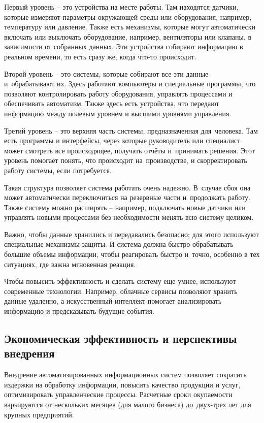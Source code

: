 \documentclass{ou}
\begin{document}
Первый уровень -- это устройства на месте работы. Там находятся датчики, которые измеряют параметры окружающей среды или оборудования, например, температуру или давление. Также есть механизмы, которые могут автоматически включать или выключать оборудование, например, вентиляторы или клапаны, в зависимости от собранных данных. Эти устройства собирают информацию в реальном времени, то есть сразу же, когда что-то происходит.

Второй уровень -- это системы, которые собирают все эти данные и~обрабатывают их. Здесь работают компьютеры и специальные программы, что позволяют контролировать работу оборудования, управлять процессами и обеспечивать автоматизм. Также здесь есть устройства, что передают информацию между полевым уровнем и высшими уровнями управления.

Третий уровень -- это верхняя часть системы, предназначенная для~человека. Там есть программы и интерфейсы, через которые руководитель или специалист может смотреть все происходящее, получать отчёты и~принимать решения. Этот уровень помогает понять, что происходит на~производстве, и скорректировать работу системы, если потребуется.

Такая структура позволяет система работать очень надежно. В~случае сбоя она может автоматически переключиться на резервные части и~продолжать работу. Также систему можно расширять -- например, подключать новые датчики или управлять новыми процессами без необходимости менять всю систему целиком.

Важно, чтобы данные хранились и передавались безопасно; для этого используют специальные механизмы защиты. И система должна быстро обрабатывать большие объемы информации, чтобы реагировать быстро и~точно, особенно в тех ситуациях, где важна мгновенная реакция.

Чтобы повысить эффективность и сделать систему еще умнее, используют современные технологии. Например, облачные сервисы позволяют хранить данные удаленно, а искусственный интеллект помогает анализировать информацию и предсказывать будущие события.
\subsection{Экономическая эффективность и перспективы внедрения}
Внедрение автоматизированных информационных систем позволяет сократить издержки на обработку информации, повысить качество продукции и услуг, оптимизировать управленческие процессы. Расчетные сроки окупаемости варьируются от нескольких месяцев (для малого бизнеса) до~двух-трех лет для крупных предприятий.
\end{document}
